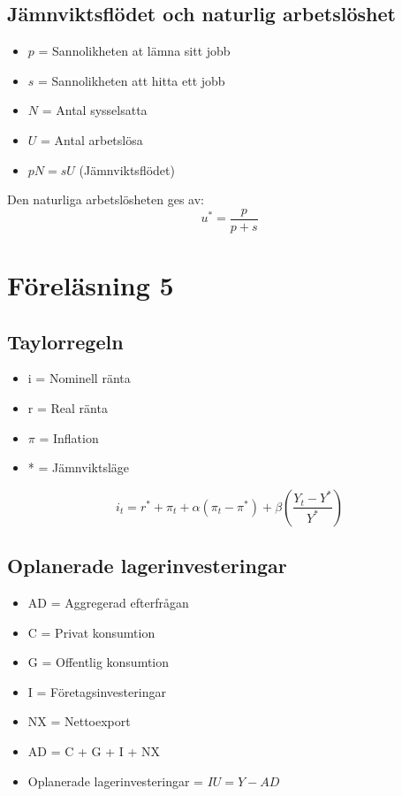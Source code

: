 \documentclass[12pt,a4paper]{article}
\begin{document}
\subsection*{Jämnviktsflödet och naturlig arbetslöshet}
\begin{itemize}
    \item $p$ = Sannolikheten at lämna sitt jobb
    \item $s$ = Sannolikheten att hitta ett jobb
    \item $N$ = Antal sysselsatta
    \item $U$ = Antal arbetslösa
    \item $pN = sU$ (Jämnviktsflödet)
\end{itemize}

Den naturliga arbetslösheten ges av:
$$u^* = \frac{p}{p+s}$$

\section*{Föreläsning 5}
\subsection*{Taylorregeln}
\begin{itemize}
    \item i = Nominell ränta
    \item r = Real ränta
    \item $\pi$ = Inflation
    \item * = Jämnviktsläge
\end{itemize}

$$i_t = r^* + \pi_t + \alpha(\pi_t - \pi^*) + \beta (\frac{Y_t - Y^*}{Y^*})$$

\subsection*{Oplanerade lagerinvesteringar}
\begin{itemize}
    \item AD = Aggregerad efterfrågan
    \item C = Privat konsumtion
    \item G = Offentlig konsumtion
    \item I = Företagsinvesteringar
    \item NX = Nettoexport
    \item AD = C + G + I + NX
    \item Oplanerade lagerinvesteringar = $IU = Y - AD$
\end{itemize}
\end{document}

